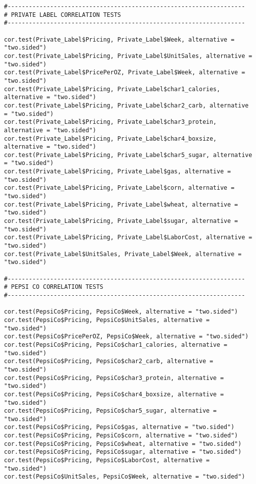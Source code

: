 \documentclass[12pt,english]{article}
\begin{document}
\begin{lstlisting}
#-------------------------------------------------------------------
# PRIVATE LABEL CORRELATION TESTS
#-------------------------------------------------------------------

cor.test(Private_Label$Pricing, Private_Label$Week, alternative = "two.sided")
cor.test(Private_Label$Pricing, Private_Label$UnitSales, alternative = "two.sided")
cor.test(Private_Label$PricePerOZ, Private_Label$Week, alternative = "two.sided")
cor.test(Private_Label$Pricing, Private_Label$char1_calories, alternative = "two.sided")
cor.test(Private_Label$Pricing, Private_Label$char2_carb, alternative = "two.sided")
cor.test(Private_Label$Pricing, Private_Label$char3_protein, alternative = "two.sided")
cor.test(Private_Label$Pricing, Private_Label$char4_boxsize, alternative = "two.sided")
cor.test(Private_Label$Pricing, Private_Label$char5_sugar, alternative = "two.sided")
cor.test(Private_Label$Pricing, Private_Label$gas, alternative = "two.sided")
cor.test(Private_Label$Pricing, Private_Label$corn, alternative = "two.sided")
cor.test(Private_Label$Pricing, Private_Label$wheat, alternative = "two.sided")
cor.test(Private_Label$Pricing, Private_Label$sugar, alternative = "two.sided")
cor.test(Private_Label$Pricing, Private_Label$LaborCost, alternative = "two.sided")
cor.test(Private_Label$UnitSales, Private_Label$Week, alternative = "two.sided")

#-------------------------------------------------------------------
# PEPSI CO CORRELATION TESTS
#-------------------------------------------------------------------

cor.test(PepsiCo$Pricing, PepsiCo$Week, alternative = "two.sided")
cor.test(PepsiCo$Pricing, PepsiCo$UnitSales, alternative = "two.sided")
cor.test(PepsiCo$PricePerOZ, PepsiCo$Week, alternative = "two.sided")
cor.test(PepsiCo$Pricing, PepsiCo$char1_calories, alternative = "two.sided")
cor.test(PepsiCo$Pricing, PepsiCo$char2_carb, alternative = "two.sided")
cor.test(PepsiCo$Pricing, PepsiCo$char3_protein, alternative = "two.sided")
cor.test(PepsiCo$Pricing, PepsiCo$char4_boxsize, alternative = "two.sided")
cor.test(PepsiCo$Pricing, PepsiCo$char5_sugar, alternative = "two.sided")
cor.test(PepsiCo$Pricing, PepsiCo$gas, alternative = "two.sided")
cor.test(PepsiCo$Pricing, PepsiCo$corn, alternative = "two.sided")
cor.test(PepsiCo$Pricing, PepsiCo$wheat, alternative = "two.sided")
cor.test(PepsiCo$Pricing, PepsiCo$sugar, alternative = "two.sided")
cor.test(PepsiCo$Pricing, PepsiCo$LaborCost, alternative = "two.sided")
cor.test(PepsiCo$UnitSales, PepsiCo$Week, alternative = "two.sided")


\end{lstlisting}
\end{document}
